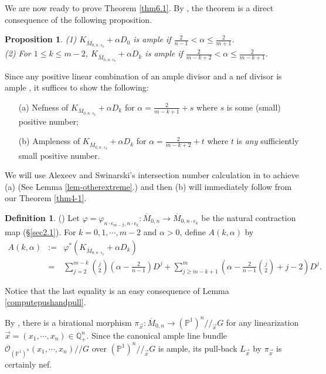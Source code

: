 \documentclass[10pt]{amsart}
\newtheorem{proposition}[theorem]{Proposition}
\theoremstyle{definition}
\newtheorem{definition}[theorem]{Definition}
\newcommand{\PP}{\mathbb{P}}
\newcommand{\QQ}{\mathbb{Q}}
\newcommand{\cO}{\mathcal{O} }
\def\Mzn{\overline{M}_{0,n} }
\def\Mzez{\overline{M}_{0,n\cdot \epsilon_0} }
\def\Mzek{\overline{M}_{0,n\cdot \epsilon_k} }
\def\git{/\!/ }
\begin{document}
We are now ready to prove Theorem \ref{thm6.1}. By \cite[Corollary
3.5]{Simpson}, the theorem is a direct consequence of the
following proposition.
\begin{proposition}\label{prop-amplerange}
(1) $K_{\Mzez}+\alpha D_0$ is ample if $\frac{2}{n-1} < \alpha \le
\frac{2}{m+1}$.\\
(2) For $1\le k\le m-2$, $K_{\Mzek}+\alpha D_k$ is ample if
$\frac{2}{m-k+2} < \alpha \le \frac{2}{m-k+1}$.

\end{proposition}

Since any positive linear combination of an ample divisor and a
nef divisor is ample \cite[Corollary 1.4.10]{Larz1}, it suffices
to show the following:
\begin{enumerate}\item[(a)] Nefness of $K_{\Mzek}+\alpha D_k$ for
$\alpha =\frac{2}{m-k+1}+s$ where $s$ is some (small) positive
number;
\item[(b)] Ampleness of $K_{\Mzek}+\alpha D_k$ for
$\alpha=\frac{2}{m-k+2}+t$ where $t$ is \emph{any} sufficiently
small positive number. \end{enumerate} We will use Alexeev and
Swinarski's intersection number calculation in \cite{AlexSwin} to
achieve (a) (See Lemma \ref{lem-otherextreme}.) and then (b) will
immediately follow from our Theorem \ref{thm4-1}.


\begin{definition} (\cite{Simpson}) Let $\varphi=\varphi_{n\cdot\epsilon_{m-2},
n\cdot\epsilon_k} : \Mzn \to \Mzek$ be the natural contraction map
(\S\ref{sec2.1}). For $k = 0,1,\cdots,m-2$ and $\alpha > 0$,
define $A(k, \alpha)$ by
\begin{eqnarray*}
    A(k, \alpha) &:=& \varphi^*(K_{\Mzek}+\alpha D_k)\\
    &=& \sum_{j = 2}^{m-k} {j \choose 2}\left(\alpha - \frac{2}{n-1}\right)D^j
    + \sum_{j \ge m-k+1}^m \left(\alpha - \frac{2}{n-1}{j \choose 2}
    + j-2\right)D^j.
\end{eqnarray*}
\end{definition}
Notice that the last equality is an easy consequence of Lemma
\ref{computepushandpull}.


By \cite{Kapranov}, there is a birational morphism $\pi_{\vec{x}}
: \Mzn \to (\PP^1)^n \git_{\vec{x}} G$ for any linearization
$\vec{x} = (x_1, \cdots, x_n) \in \QQ_+^n$. Since the canonical
ample line bundle $\cO_{(\PP^1)^n }(x_1, \cdots, x_n)\git G$ over
$(\PP^1)^n \git_{\vec{x}} G$ is ample, its pull-back $L_{\vec{x}}$
by $\pi_{\vec{x}}$  is certainly nef.
\end{document}
